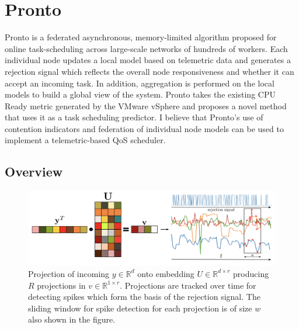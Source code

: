 \section{Pronto}
Pronto is a federated asynchronous, memory-limited algorithm proposed for
online task-scheduling across large-scale networks of hundreds of workers. Each
individual node updates a local model based on telemetric data and generates a
rejection signal which reflects the overall node responsiveness and whether it
can accept an incoming task. In addition, aggregation is performed on the local
models to build a global view of the system. Pronto takes the existing CPU Ready
metric generated by the VMware vSphere and proposes a novel method that uses it
as a task scheduling predictor. I believe that Pronto's use of contention
indicators and federation of individual node models can be used to implement a
telemetric-based QoS scheduler.


\subsection{Overview}
\label{pronto-overview}

\begin{figure}[h]
    \centering
    \includegraphics[width=\textwidth]{images/pronto}
    \caption{Projection of incoming $y \in \mathbb{R}^d$ onto embedding $U \in
    \mathbb{R}^{d \times r}$ producing $R$ projections in $v \in \mathbb{R}^{1
    \times r}$. Projections are tracked over time for detecting spikes which
    form the basis of the rejection signal. The sliding window for spike
    detection for each projection is of size $w$ also shown in the figure.}
    \label{pronto-components}
\end{figure}

